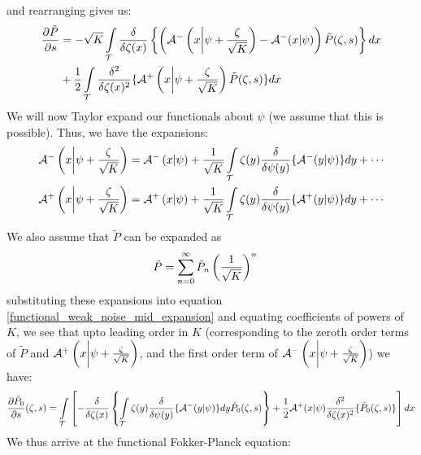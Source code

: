 and rearranging gives us:
\begin{align}
\label{functional_weak_noise_mid_expansion}
\begin{split}
\frac{\partial \Tilde{P}}{\partial s} &= -\sqrt{K}\int\limits_{\mathcal{T}}\frac{\delta }{\delta \zeta(x)}\left\{\left(\mathcal{A}^{-}\left(x\bigg{|}\psi+\frac{\zeta}{\sqrt{K}}\right)-\mathcal{A}^{-}(x|\psi)\right)\Tilde{P}(\zeta,s)\right\}dx\\
&+\frac{1}{2}\int\limits_{\mathcal{T}}\frac{\delta^2}{\delta\zeta(x)^2}\{\mathcal{A}^{+}\left(x\bigg{|}\psi+\frac{\zeta}{\sqrt{K}}\right)\Tilde{P}(\zeta,s)\}dx
\end{split}
\end{align}
We will now Taylor expand our functionals about $\psi$ (we assume that this is possible). Thus, we have the expansions:
\begin{align*}
    \mathcal{A}^{-}\left(x\bigg{|}\psi+\frac{\zeta}{\sqrt{K}}\right) &= \mathcal{A}^{-}\left(x|\psi\right) + \frac{1}{\sqrt{K}}\int\limits_{\mathcal{T}}\zeta(y)\frac{\delta}{\delta \psi(y)}\{\mathcal{A}^{-}(y|\psi)\}dy + \cdots\\
    \mathcal{A}^{+}\left(x\bigg{|}\psi+\frac{\zeta}{\sqrt{K}}\right) &= \mathcal{A}^{+}\left(x|\psi\right) + \frac{1}{\sqrt{K}}\int\limits_{\mathcal{T}}\zeta(y)\frac{\delta}{\delta \psi(y)}\{\mathcal{A}^{+}(y|\psi)\}dy + \cdots
\end{align*}
We also assume that $\tilde{P}$ can be expanded as
\begin{align*}
     \Tilde{P} &= \sum\limits_{n=0}^{\infty}\Tilde{P}_n\left(\frac{1}{\sqrt{K}}\right)^n
\end{align*}
substituting these expansions into equation \eqref{functional_weak_noise_mid_expansion} and equating coefficients of powers of $K$, we see that upto leading order in $K$ (corresponding to the zeroth order terms of $\tilde{P}$ and $\mathcal{A}^{+}\left(x\bigg{|}\psi+\frac{\zeta}{\sqrt{K}}\right)$, and the first order term of $\mathcal{A}^{-}\left(x\bigg{|}\psi+\frac{\zeta}{\sqrt{K}}\right)$) we have:
\begin{equation*}
\frac{\partial \Tilde{P}_{0}}{\partial s}(\zeta,s) = \int\limits_{\mathcal{T}}\left[-\frac{\delta}{\delta \zeta(x)}\left\{\int\limits_{\mathcal{T}}\zeta(y)\frac{\delta}{\delta \psi(y)}\{\mathcal{A}^{-}(y|\psi)\}dy\Tilde{P}_{0}(\zeta,s)\right\}+\frac{1}{2}\mathcal{A}^{+}(x|\psi)\frac{\delta^2}{\delta\zeta(x)^2}\{\Tilde{P}_{0}(\zeta,s)\}\right]dx
\end{equation*}
We thus arrive at the functional Fokker-Planck equation:
